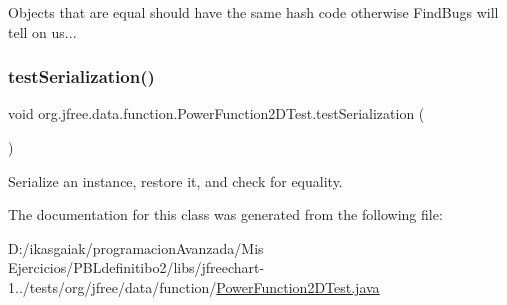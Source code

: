 Objects that are equal should have the same hash code otherwise Find\+Bugs will tell on us... \mbox{\label{classorg_1_1jfree_1_1data_1_1function_1_1_power_function2_d_test_a2842e070c6c8889d79ba7e7e4fa58bf5}} 
\subsubsection{\texorpdfstring{test\+Serialization()}{testSerialization()}}
{\footnotesize\ttfamily void org.\+jfree.\+data.\+function.\+Power\+Function2\+D\+Test.\+test\+Serialization (\begin{DoxyParamCaption}{ }\end{DoxyParamCaption})}

Serialize an instance, restore it, and check for equality. 

The documentation for this class was generated from the following file\+:\begin{DoxyCompactItemize}
\item 
D\+:/ikasgaiak/programacion\+Avanzada/\+Mis Ejercicios/\+P\+B\+Ldefinitibo2/libs/jfreechart-\/1../tests/org/jfree/data/function/\mbox{\hyperlink{_power_function2_d_test_8java}{Power\+Function2\+D\+Test.\+java}}\end{DoxyCompactItemize}
